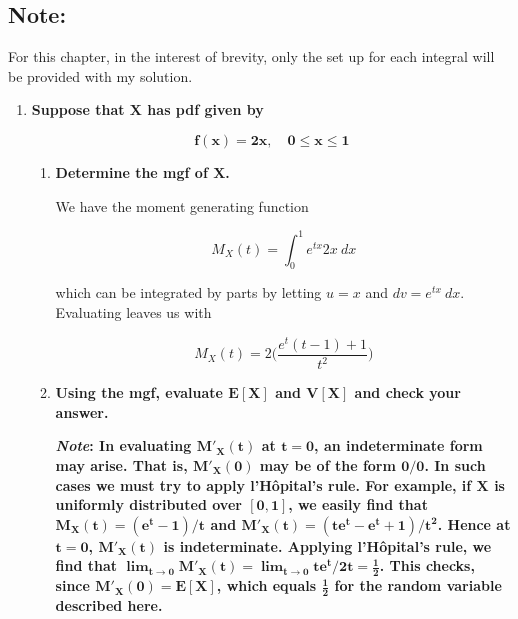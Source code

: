 \documentclass[10pt, oneside]{article}
\begin{document}
{}
\subsection*{Note:}

For this chapter, in the interest of brevity, only the set up for each integral will be provided with my solution.

\begin{enumerate}[label=10.\arabic*]
\itemsep0em 
\item  \begin{tcolorbox}[
  colback=Cerulean!5!white,
  colframe=Cerulean!75!black]
\textbf{Suppose that $\bm{X}$ has pdf given by}

\[ \bm{f(x) = 2x, \quad 0 \leq x \leq 1} \]
\end{tcolorbox}

	\begin{enumerate}
	\item  \begin{tcolorbox}[
	  colback=Cerulean!5!white,
	  colframe=Cerulean!75!black]
	\textbf{Determine the mgf of $\bm{X}$.}
	\end{tcolorbox}
	
	We have the moment generating function
	
	\[ M_X (t) = \int^1_0 e^{tx} 2x \ dx \]
	
	which can be integrated by parts by letting $u = x$ and $dv = e^{tx} \ dx$. Evaluating leaves us with
	
	\[ \boxed{M_X(t) = 2 \bigg( \frac{e^t (t-1) + 1}{t^2} \bigg) } \]
	
	\item  \begin{tcolorbox}[
	  colback=Cerulean!5!white,
	  colframe=Cerulean!75!black]
	\textbf{Using the mgf, evaluate $\bm{E[X]}$ and $\bm{V[X]}$ and check your answer.}
	
	\textbf{\textit{Note}: In evaluating $\bm{M'_X(t)}$ at $\bm{t=0}$, an indeterminate form may arise. That is, $\bm{M'_X(0)}$ may be of the form $\bm{0/0}$. In such cases we must try to apply l'H\^{o}pital's rule. For example, if $\bm{X}$ is uniformly distributed over $\bm{[0,1]}$, we easily find that $\bm{M_X(t) = (e^t - 1)/t}$ and $\bm{M'_X(t) = (te^t - e^t + 1)/t^2}$. Hence at $\bm{t=0}$, $\bm{M'_X(t)}$ is indeterminate. Applying l'H\^{o}pital's rule, we find that $\bm{\lim_{t \rightarrow 0} M'_X(t) = \lim_{t \rightarrow 0} te^t / 2t = \frac{1}{2}}$. This checks, since $\bm{M'_X(0) = E[X]}$, which equals $\bm{\frac{1}{2}}$ for the random variable described here.}
	\end{tcolorbox}
	

\end{enumerate}
\end{enumerate}
\end{document}
